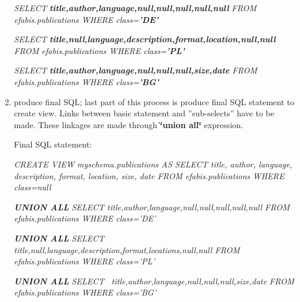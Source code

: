 \begin{enumerate}
\emph{SELECT} \textbf{\emph{title,author,language,}}\textbf{\emph{\emph{null,null,null,null,null}}}
\emph{FROM} \textbf{\emph{}}\emph{efabis.publications WHERE} \textbf{\emph{}}\emph{class=}\textbf{\emph{'DE'}}
\medskip{}

\emph{SELECT} \textbf{\emph{title,}}\textbf{\emph{\emph{null}}}\textbf{\emph{,language,description,format,location,}}\textbf{\emph{\emph{null,null}}}
\emph{FROM} \textbf{\emph{}}\emph{efabis.publications WHERE} \textbf{\emph{}}\emph{class=}\textbf{\emph{'PL'}}
\medskip{}

\emph{SELECT} \textbf{\emph{title,author,language,}}\textbf{\emph{\emph{null,null,null}}}\textbf{\emph{,size,date}}
\emph{FROM} \textbf{\emph{}}\emph{efabis.publications WHERE} \textbf{\emph{}}\emph{class=}\textbf{\emph{'BG'}}


\item produce final SQL; last part of this process is produce final SQL
statement to create view. Links between basic statement and ''sub-selects''
have to be made. These linkages are made through \textbf{\char`\"{}union
all\char`\"{}} expression.

Final SQL statement:

\begin{center}\emph{CREATE VIEW} \textbf{\emph{}}\emph{myschema.publications
AS SELECT title, author, language, description, format, location,
size, date FROM efabis.publications WHERE class=}\emph{\emph{null }}\end{center}

\begin{center}\textbf{\emph{UNION ALL}} \emph{SELECT} \emph{title,author,language,}\emph{\emph{null,null,null,null,null}}
\emph{FROM} \textbf{\emph{}}\emph{efabis.publications WHERE} \textbf{\emph{}}\emph{class='DE'}\end{center}

\begin{center}\textbf{\emph{UNION ALL}} \emph{SELECT} \emph{title,null,language}\emph{\emph{,}}\emph{description,format,locations,}\emph{\emph{null,null}}
\emph{FROM} \textbf{\emph{}}\emph{efabis.publications WHERE} \textbf{\emph{}}\emph{class='PL'}\end{center}

\begin{center}\textbf{\emph{UNION ALL}} \emph{SELECT ~title,author,language,}\emph{\emph{null,null,null}}\emph{,size,date}
\textbf{\emph{}}\emph{FROM} \textbf{\emph{}}\emph{efabis.publications
WHERE} \textbf{\emph{}}\emph{class='BG'}\end{center}


\end{enumerate}
